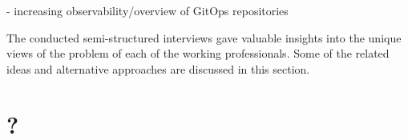 - increasing observability/overview of GitOps repositories


The conducted semi-structured interviews gave valuable insights into
the unique views of the problem of each of the working professionals.
Some of the related ideas and alternative approaches are discussed in this section.







\section{?}
































